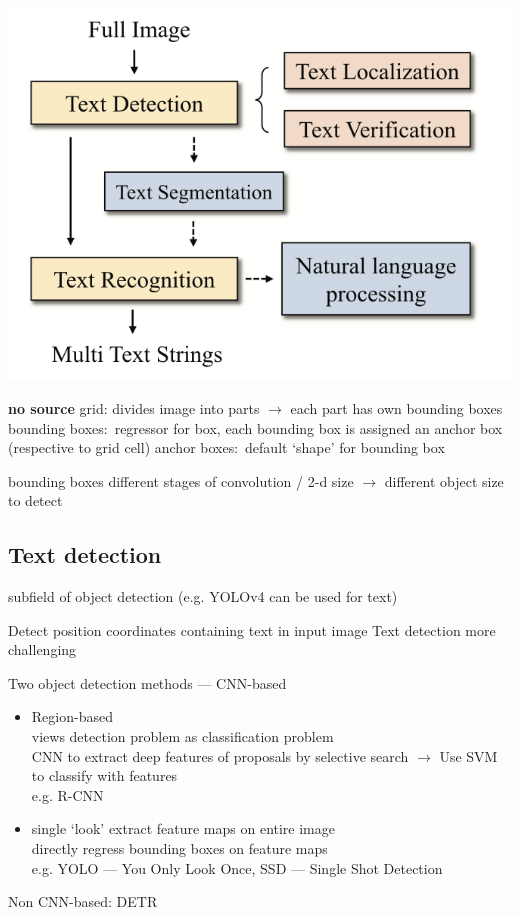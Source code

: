 \includegraphics{img/OCR-Basics.png}


\textbf{no source}
grid: divides image into parts $\rightarrow$ each part has own bounding boxes
bounding boxes:~regressor for box, each bounding box is assigned an anchor box (respective to grid cell)
anchor boxes:~default `shape' for bounding box

bounding boxes different stages of convolution / 2-d size $\rightarrow$ different object size to detect

\subsection*{Text detection}
subfield of object detection (e.g. YOLOv4 can be used for text)

Detect position coordinates containing text in input image
Text detection more challenging

Two object detection methods --- CNN-based
\begin{itemize}
    \item Region-based \\
        views detection problem as classification problem\\
        CNN to extract deep features of proposals by selective search $\rightarrow$  Use SVM to
            classify with features\\
        e.g. R-CNN
    \item  single `look'
        extract feature maps on entire image\\
        directly regress bounding boxes on feature maps\\
        e.g. YOLO --- You Only Look Once, SSD --- Single Shot Detection
\end{itemize}
Non CNN-based: DETR

